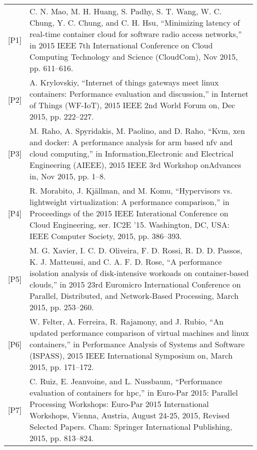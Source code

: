 \begin{table}[]
\begin{tabular}{lp{13cm}}
{[}P1{]}  & C. N. Mao, M. H. Huang, S. Padhy, S. T. Wang, W. C. Chung, Y. C. Chung, and C. H. Hsu, “Minimizing latency of real-time container cloud for software radio access networks,” in 2015 IEEE 7th International Conference on Cloud Computing Technology and Science (CloudCom), Nov 2015, pp. 611–616.                                  \\
{[}P2{]}  & A. Krylovskiy, “Internet of things gateways meet linux containers: Performance evaluation and discussion,” in Internet of Things (WF-IoT), 2015 IEEE 2nd World Forum on, Dec 2015, pp. 222–227.                                                                                                                                      \\
{[}P3{]}  & M. Raho, A. Spyridakis, M. Paolino, and D. Raho, “Kvm, xen and docker: A performance analysis for arm based nfv and cloud computing,” in Information,Electronic and Electrical Engineering (AIEEE), 2015 IEEE 3rd Workshop onAdvances in, Nov 2015, pp. 1–8.                                                                         \\
{[}P4{]}  & R. Morabito, J. Kj\"allman, and M. Komu, “Hypervisors vs. lightweight virtualization: A performance comparison,” in Proceedings of the 2015 IEEE Interational Conference on Cloud Engineering, ser. IC2E ’15. Washington, DC, USA: IEEE Computer Society, 2015, pp. 386–393.                                                      \\
{[}P5{]}  & M. G. Xavier, I. C. D. Oliveira, F. D. Rossi, R. D. D. Passos, K. J. Matteussi, and C. A. F. D. Rose, “A performance isolation analysis of disk-intensive workoads on container-based clouds,” in 2015 23rd Euromicro International Conference on Parallel, Distributed, and Network-Based Processing, March 2015, pp. 253–260. \\
{[}P6{]}  & W. Felter, A. Ferreira, R. Rajamony, and J. Rubio, “An updated performance comparison of virtual machines and linux containers,” in Performance Analysis of Systems and Software (ISPASS), 2015 IEEE International Symposium on, March 2015, pp. 171–172.                                                                            \\
{[}P7{]}  & C. Ruiz, E. Jeanvoine, and L. Nussbaum, “Performance evaluation of containers for hpc,” in Euro-Par 2015: Parallel Processing Workshops: Euro-Par 2015 International Workshops, Vienna, Austria, August 24-25, 2015, Revised Selected Papers. Cham: Springer International Publishing, 2015, pp. 813–824. \\

\end{tabular}
\end{table}
